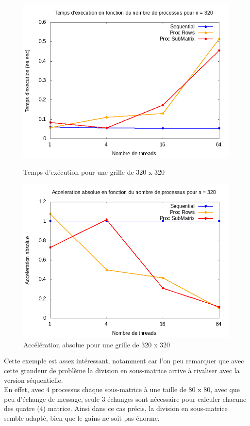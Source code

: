 \documentclass[10pt,a4paper]{article}
\begin{document}
\newpage
\begin{figure}[h]
  \centering
  \begin{minipage}[b]{0.49\textwidth}
	\includegraphics[width=\textwidth]{./Time/size_320_time.png}
    \caption{Temps d'exécution pour une grille de 320 x 320}
  \end{minipage}
  \hfill
  \begin{minipage}[b]{0.49\textwidth}
    \includegraphics[width=\textwidth]{./Time/size_320_acceleration.png}
    \caption{Accélération absolue pour une grille de 320 x 320}
  \end{minipage}
\end{figure}

Cette exemple est assez intéressant, notamment car l'on peu remarquer que avec cette grandeur de problème la division en sous-matrice arrive à rivaliser avec la version séquentielle. \\
En effet, avec 4 processus chaque sous-matrice à une taille de 80 x 80, avec que peu d'échange de message, seule 3 échanges sont nécessaire pour calculer chacune des quatre (4) matrice. Ainsi dans ce cas précis, la division en sous-matrice semble adapté, bien que le gains ne soit pas énorme.\\
\end{document}
